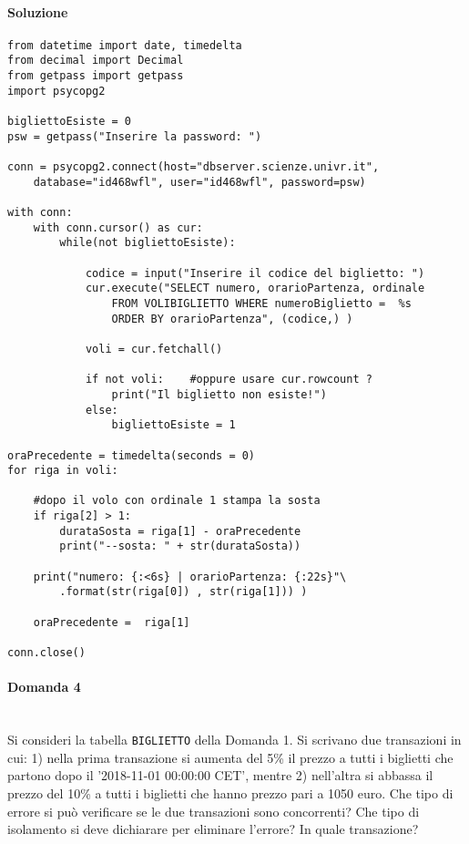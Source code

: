 \documentclass[a4paper, 10pt, titlepage]{article}
\begin{document}
\paragraph{Soluzione}\dotfill
\lstset{language=Python}
\begin{lstlisting}
from datetime import date, timedelta
from decimal import Decimal
from getpass import getpass
import psycopg2

bigliettoEsiste = 0
psw = getpass("Inserire la password: ")
    
conn = psycopg2.connect(host="dbserver.scienze.univr.it",
	database="id468wfl", user="id468wfl", password=psw)
	
with conn:
	with conn.cursor() as cur:
		while(not bigliettoEsiste):
	
			codice = input("Inserire il codice del biglietto: ")	
			cur.execute("SELECT numero, orarioPartenza, ordinale
				FROM VOLIBIGLIETTO WHERE numeroBiglietto =  %s
				ORDER BY orarioPartenza", (codice,) )
				
			voli = cur.fetchall()
			
			if not voli:	#oppure usare cur.rowcount ?
				print("Il biglietto non esiste!")
			else:
				bigliettoEsiste = 1

oraPrecedente = timedelta(seconds = 0)
for riga in voli:

	#dopo il volo con ordinale 1 stampa la sosta
	if riga[2] > 1:
    	durataSosta = riga[1] - oraPrecedente
        print("--sosta: " + str(durataSosta))
        
	print("numero: {:<6s} | orarioPartenza: {:22s}"\
        .format(str(riga[0]) , str(riga[1])) )
        
    oraPrecedente =  riga[1]
    
conn.close()

\end{lstlisting}
\newpage 
\paragraph{Domanda 4}\dotfill
\\Si consideri la tabella \lstinline|BIGLIETTO| della Domanda 1. Si scrivano due transazioni in cui: 1) nella prima transazione si aumenta del 5\% il prezzo a tutti i biglietti che partono dopo il '2018-11-01 00:00:00 CET', mentre 2) nell'altra si abbassa il prezzo del 10\% a tutti i biglietti che hanno prezzo pari a 1050 euro. Che tipo di errore si può verificare se le due transazioni sono concorrenti? Che tipo di isolamento si deve dichiarare per eliminare l'errore? In quale transazione?
\end{document}
